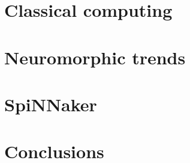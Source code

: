 
\section{Classical computing}

\section{Neuromorphic trends}

\section{SpiNNaker}

%
\section{Conclusions}
